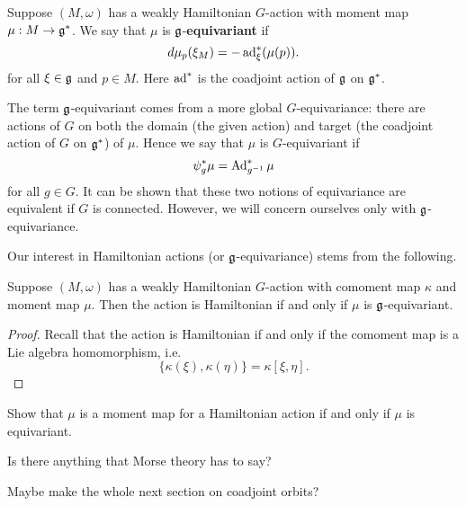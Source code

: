 \documentclass{amsart}
\begin{document}
\begin{definition}
    Suppose $(M,\omega)$ has a weakly Hamiltonian $G$-action with moment map $\mu:M\to\mathfrak g^*$.
    We say that $\mu$ is $\mathfrak g$-\textbf{equivariant} if
    \begin{equation*}
        d\mu_p(\xi_M) = -\operatorname{ad}_\xi^*(\mu(p)).
    \end{equation*}
    for all $\xi\in\mathfrak g$ and $p\in M$. Here $\operatorname{ad}^*$ is the coadjoint action of $\mathfrak g$ on $\mathfrak g^*$.
\end{definition}
\begin{remark}
    The term $\mathfrak g$-equivariant comes from a more global $G$-equivariance: there
    are actions of $G$ on both the domain (the given action) and target
    (the coadjoint action of $G$ on $\mathfrak g^*$) of $\mu$. Hence we say that $\mu$ is $G$-equivariant if
    \begin{equation*}
        \psi_g^*\mu = \operatorname{Ad}^*_{g^{-1}}\mu
    \end{equation*}
    for all $g\in G$. It can be shown that these two notions of equivariance are equivalent if $G$
    is connected. However, we will concern ourselves only with $\mathfrak g$-equivariance.
\end{remark}

Our interest in Hamiltonian actions (or $\mathfrak g$-equivariance) stems from the following.
\begin{proposition}
    Suppose $(M,\omega)$ has a weakly Hamiltonian $G$-action with comoment map $\kappa$ and
    moment map $\mu$. Then the action is Hamiltonian if and only if $\mu$ is $\mathfrak g$-equivariant.
\end{proposition}
\begin{proof}
    Recall that the action is Hamiltonian if and only if the comoment map is a Lie algebra
    homomorphism, i.e.
    \begin{equation*}
        \{\kappa(\xi), \kappa(\eta)\} = \kappa[\xi,\eta].
    \end{equation*}
\end{proof}

\begin{example}
    
\end{example}

Show that $\mu$ is a moment map for a Hamiltonian action if and only if $\mu$ is equivariant.

Is there anything that Morse theory has to say?

Maybe make the whole next section on coadjoint orbits?
\end{document}
